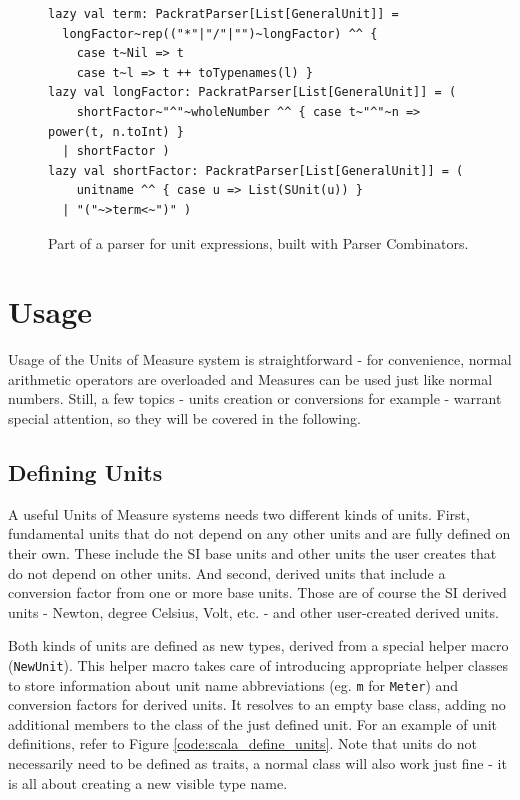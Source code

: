 \documentclass[12pt,oneside,a4paper]{scrbook}
\begin{document}
\begin{figure}
\begin{verbatim}
lazy val term: PackratParser[List[GeneralUnit]] =
  longFactor~rep(("*"|"/"|"")~longFactor) ^^ {
    case t~Nil => t
    case t~l => t ++ toTypenames(l) }
lazy val longFactor: PackratParser[List[GeneralUnit]] = (
    shortFactor~"^"~wholeNumber ^^ { case t~"^"~n => power(t, n.toInt) }
  | shortFactor )
lazy val shortFactor: PackratParser[List[GeneralUnit]] = (
    unitname ^^ { case u => List(SUnit(u)) }
  | "("~>term<~")" )
\end{verbatim}
\caption{Part of a parser for unit expressions, built with Parser Combinators.}
\label{code:scala_parse}
\end{figure}





\chapter{Usage}
Usage of the Units of Measure system is straightforward - for convenience, normal arithmetic operators are overloaded and Measures can be used just like normal numbers. Still, a few topics - units creation or conversions for example - warrant special attention, so they will be covered in the following.


\section{Defining Units}
A useful Units of Measure systems needs two different kinds of units. First, fundamental units that do not depend on any other units and are fully defined on their own. These include the SI base units and other units the user creates that do not depend on other units. And second, derived units that include a conversion factor from one or more base units. Those are of course the SI derived units - Newton, degree Celsius, Volt, etc. - and other user-created derived units.

Both kinds of units are defined as new types, derived from a special helper macro (\verb|NewUnit|). This helper macro takes care of introducing appropriate helper classes to store information about unit name abbreviations (eg. \verb|m| for \verb|Meter|) and conversion factors for derived units. It resolves to an empty base class, adding no additional members to the class of the just defined unit. For an example of unit definitions, refer to Figure \ref{code:scala_define_units}. Note that units do not necessarily need to be defined as traits, a normal class will also work just fine - it is all about creating a new visible type name.
\end{document}
